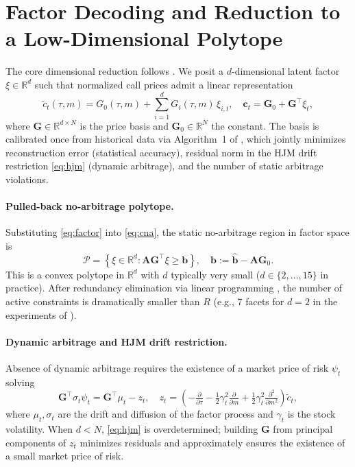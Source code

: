 \documentclass{article}
\newcommand{\R}{\mathbb{R}}
\newcommand{\1}{\mathbf{1}}
\newcommand{\cP}{\mathcal{P}}
\begin{document}
\section{Factor Decoding and Reduction to a Low-Dimensional Polytope}
\label{sec:factors}

The core dimensional reduction follows \citet{cohen2021}. We posit a $d$-dimensional latent factor $\xi \in \R^d$ such that normalized call prices admit a linear representation
\begin{equation}
\tilde c_t(\tau, m) = G_0(\tau, m) + \sum_{i=1}^d G_i(\tau, m)\, \xi_{i,t}, \quad \mathbf{c}_t = \mathbf{G}_0 + \mathbf{G}^\top \xi_t,
\label{eq:factor}
\end{equation}
where $\mathbf{G} \in \R^{d \times N}$ is the price basis and $\mathbf{G}_0 \in \R^N$ the constant. The basis is calibrated once from historical data via Algorithm~1 of \citet{cohen2021}, which jointly minimizes reconstruction error (statistical accuracy), residual norm in the HJM drift restriction \eqref{eq:hjm} (dynamic arbitrage), and the number of static arbitrage violations.

\paragraph{Pulled-back no-arbitrage polytope.} Substituting \eqref{eq:factor} into \eqref{eq:cna}, the static no-arbitrage region in factor space is
\begin{equation}
\cP = \left\{ \xi \in \R^d : \mathbf{A}\mathbf{G}^\top \xi \ge \mathbf{b} \right\}, \quad \mathbf{b} := \hat{\mathbf{b}} - \mathbf{A}\mathbf{G}_0.
\label{eq:polytope}
\end{equation}
This is a convex polytope in $\R^d$ with $d$ typically very small ($d \in \{2, \ldots, 15\}$ in practice). After redundancy elimination via linear programming \citep{caron1989}, the number of active constraints is dramatically smaller than $R$ (e.g., 7 facets for $d=2$ in the experiments of \citet{cohen2021}).

\paragraph{Dynamic arbitrage and HJM drift restriction.} Absence of dynamic arbitrage requires the existence of a market price of risk $\psi_t$ solving \citep{cohen2021}
\begin{equation}
\mathbf{G}^\top \sigma_t \psi_t = \mathbf{G}^\top \mu_t - z_t, \quad z_t = \left( -\tfrac{\partial}{\partial \tau} - \tfrac{1}{2}\gamma_t^2 \tfrac{\partial}{\partial m} + \tfrac{1}{2}\gamma_t^2 \tfrac{\partial^2}{\partial m^2} \right) \tilde c_t,
\label{eq:hjm}
\end{equation}
where $\mu_t, \sigma_t$ are the drift and diffusion of the factor process and $\gamma_t$ is the stock volatility. When $d < N$, \eqref{eq:hjm} is overdetermined; building $\mathbf{G}$ from principal components of $z_t$ minimizes residuals and approximately ensures the existence of a small market price of risk.
\end{document}
